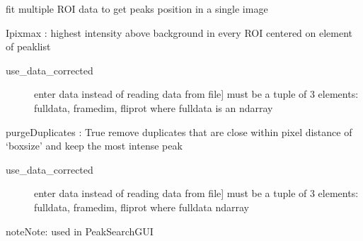 \documentclass[letterpaper,10pt,english]{sphinxmanual}
\begin{document}
\begin{fulllineitems}
\label{\detokenize{PeakSearch:LaueTools.readmccd.fitoneimage_manypeaks}}
fit multiple ROI data to get peaks position in a single image

Ipixmax  :  highest intensity above background in every ROI centered on element of peaklist
\begin{description}
\item[{use\_data\_corrected}] \leavevmode{[}enter data instead of reading data from file{]}
must be a tuple of 3 elements:
fulldata, framedim, fliprot
where fulldata is an ndarray

\end{description}

purgeDuplicates    : True   remove duplicates that are close within pixel distance of ‘boxsize’ and keep the most intense peak
\begin{description}
\item[{use\_data\_corrected}] \leavevmode{[}enter data instead of reading data from file{]}
must be a tuple of 3 elements:
fulldata, framedim, fliprot
where fulldata  ndarray

\end{description}

\begin{sphinxadmonition}{note}{Note:}
used in PeakSearchGUI
\end{sphinxadmonition}

\end{fulllineitems}

\end{document}
